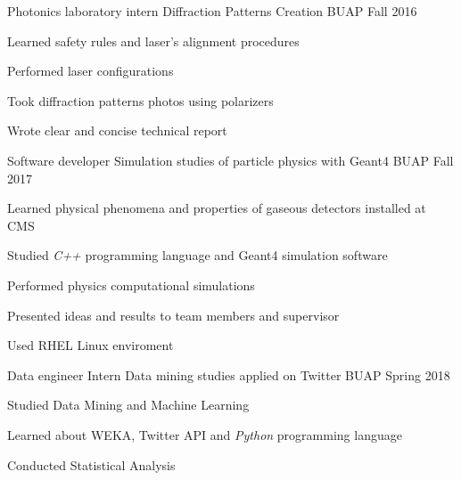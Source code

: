 
\begin{cventries}
  \cventry
    {Photonics laboratory intern} %
    {Diffraction Patterns Creation} %
    {BUAP} %
    {Fall 2016} %
    {
      \begin{cvitems} %
        \item Learned safety rules and laser's alignment procedures
        \item Performed laser configurations
        \item Took diffraction patterns photos using polarizers
        \item Wrote clear and concise technical report
      \end{cvitems}
    }

  \cventry
    {Software developer} %
    {Simulation studies of particle physics with Geant4} %
    {BUAP} %
    {Fall 2017} %
    {
      \begin{cvitems} %
        \item Learned physical phenomena and properties of gaseous detectors installed at CMS
        \item Studied {\it C++} programming language and Geant4 simulation software
        \item Performed physics computational simulations
        \item Presented ideas and results to team members and supervisor
        \item Used RHEL Linux enviroment
      \end{cvitems}
    }

  \cventry
    {Data engineer Intern} %
    {Data mining studies applied on Twitter} %
    {BUAP} %
    {Spring 2018} %
    {
      \begin{cvitems} %
        \item Studied Data Mining and Machine Learning
        \item Learned about WEKA, Twitter API and {\it Python} programming language
        \item Conducted Statistical Analysis
      \end{cvitems}
    }
\end{cventries}

